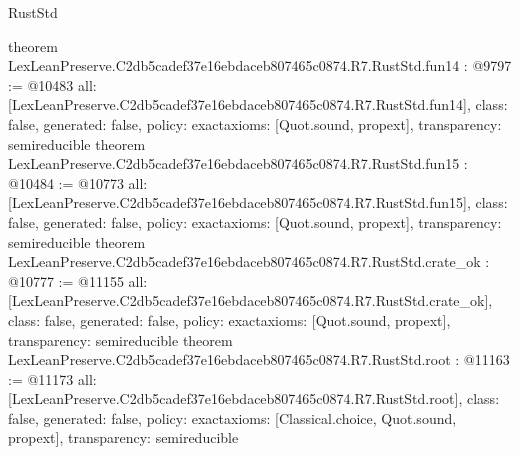 \begin{lexlean}{RustStd}
\begin{coremodule}
{}
theorem LexLeanPreserve.C2db5cadef37e16ebdaceb807465c0874.R7.RustStd.fun14 : @9797 := @10483 {
  all: [LexLeanPreserve.C2db5cadef37e16ebdaceb807465c0874.R7.RustStd.fun14],
  class: false,
  generated: false,
  policy: exact{axioms: [Quot.sound, propext]},
  transparency: semireducible
}
theorem LexLeanPreserve.C2db5cadef37e16ebdaceb807465c0874.R7.RustStd.fun15 : @10484 := @10773 {
  all: [LexLeanPreserve.C2db5cadef37e16ebdaceb807465c0874.R7.RustStd.fun15],
  class: false,
  generated: false,
  policy: exact{axioms: [Quot.sound, propext]},
  transparency: semireducible
}
theorem LexLeanPreserve.C2db5cadef37e16ebdaceb807465c0874.R7.RustStd.crate_ok : @10777 := @11155 {
  all: [LexLeanPreserve.C2db5cadef37e16ebdaceb807465c0874.R7.RustStd.crate_ok],
  class: false,
  generated: false,
  policy: exact{axioms: [Quot.sound, propext]},
  transparency: semireducible
}
theorem LexLeanPreserve.C2db5cadef37e16ebdaceb807465c0874.R7.RustStd.root : @11163 := @11173 {
  all: [LexLeanPreserve.C2db5cadef37e16ebdaceb807465c0874.R7.RustStd.root],
  class: false,
  generated: false,
  policy: exact{axioms: [Classical.choice, Quot.sound, propext]},
  transparency: semireducible
}


\end{coremodule}
\end{lexlean}

